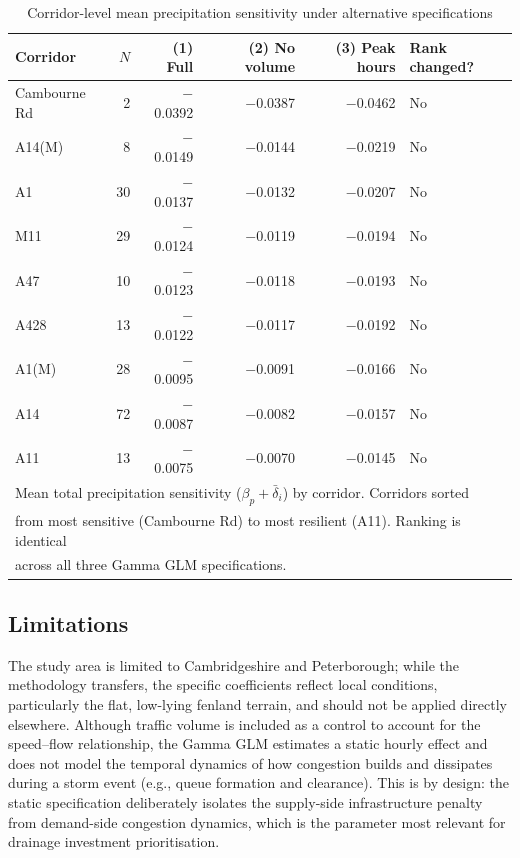 \documentclass[review,authoryear]{elsarticle}
\begin{document}
\begin{table}[H]
\centering
\caption{Corridor-level mean precipitation sensitivity under alternative specifications}
\label{tab:corridor_robust}
\begin{tabular}{lrrrrl}
\toprule
Corridor & $N$ & (1) Full & (2) No volume & (3) Peak hours & Rank changed? \\
\midrule
Cambourne Rd & 2 & $-$0.0392 & $-$0.0387 & $-$0.0462 & No \\
A14(M) & 8 & $-$0.0149 & $-$0.0144 & $-$0.0219 & No \\
A1 & 30 & $-$0.0137 & $-$0.0132 & $-$0.0207 & No \\
M11 & 29 & $-$0.0124 & $-$0.0119 & $-$0.0194 & No \\
A47 & 10 & $-$0.0123 & $-$0.0118 & $-$0.0193 & No \\
A428 & 13 & $-$0.0122 & $-$0.0117 & $-$0.0192 & No \\
A1(M) & 28 & $-$0.0095 & $-$0.0091 & $-$0.0166 & No \\
A14 & 72 & $-$0.0087 & $-$0.0082 & $-$0.0157 & No \\
A11 & 13 & $-$0.0075 & $-$0.0070 & $-$0.0145 & No \\
\bottomrule
\multicolumn{6}{l}{\footnotesize Mean total precipitation sensitivity ($\beta_p + \bar{\delta}_i$) by corridor. Corridors sorted} \\
\multicolumn{6}{l}{\footnotesize from most sensitive (Cambourne Rd) to most resilient (A11). Ranking is identical} \\
\multicolumn{6}{l}{\footnotesize across all three Gamma GLM specifications.} \\
\end{tabular}
\end{table}

\subsection{Limitations}
\label{sec:disc:limits}

The study area is limited to Cambridgeshire and Peterborough; while the methodology transfers, the specific coefficients reflect local conditions, particularly the flat, low-lying fenland terrain, and should not be applied directly elsewhere. Although traffic volume is included as a control to account for the speed--flow relationship, the Gamma GLM estimates a static hourly effect and does not model the temporal dynamics of how congestion builds and dissipates during a storm event (e.g., queue formation and clearance). This is by design: the static specification deliberately isolates the supply-side infrastructure penalty from demand-side congestion dynamics, which is the parameter most relevant for drainage investment prioritisation.
\end{document}
